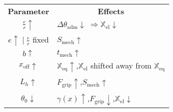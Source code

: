 \documentclass[border=1mm,
               class=article
               preview]{standalone}
\begin{document}
\begin{tabular}{ c l l }
    \hline
    \rowcolor{black} \textbf{\color{white} Parameter} & \multicolumn{2}{c}{\textbf{\color{white} Effects}}\\
    \cellcolor{black!5}$\frac{e}{r} \uparrow$ & \cellcolor{black!5} $\Delta\theta_\text{adm} \downarrow \;  \Rightarrow \mathbb{X}_\text{el} \downarrow$  & \cellcolor{black!5}  \\

    \cellcolor{black!10} $e \uparrow \;|\; \frac{e}{r}$ fixed & \cellcolor{black!10} $S_{\text{mech}}\uparrow $ & \cellcolor{black!5} \\

    \cellcolor{black!5} $b \uparrow$ & \cellcolor{black!5} $t_{\text{mech}}\uparrow $ &\cellcolor{black!5} \multirow{-3}{*}{$K_\theta \uparrow \;
    \Rightarrow \begin{cases} \mathbb{X}_\text{eq} \uparrow\\ F_\text{grip} \downarrow\\
    \end{cases}$}     \\

     \rowcolor{black!10} $x_{\text{off}}\uparrow$ & \multicolumn{2}{l}{$\mathbb{X}_\text{eq}\uparrow$,\quad $\mathbb{X}_\text{el}$ shifted away from $\mathbb{X}_\text{eq}$}\\

     \rowcolor{black!5} $L_h\uparrow$ & \multicolumn{2}{l}{$F_\text{grip}\uparrow$,\quad $S_{\text{mech}}\uparrow $}\\

     \rowcolor{black!10} $\theta_0\downarrow$ & \multicolumn{2}{l}{$\gamma(x)\uparrow$,\quad$F_{\text{grip}}\downarrow$,\quad$\mathbb{X}_\text{el}\downarrow$}\\
\end{tabular}
\end{document}
